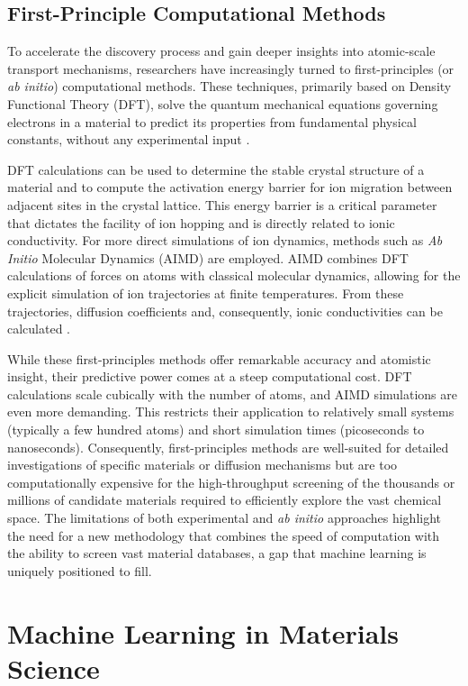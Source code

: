 \subsection{First-Principle Computational Methods}

To accelerate the discovery process and gain deeper insights into atomic-scale transport mechanisms, researchers have increasingly turned to first-principles (or \textit{ab initio}) computational methods. These techniques, primarily based on Density Functional Theory (DFT), solve the quantum mechanical equations governing electrons in a material to predict its properties from fundamental physical constants, without any experimental input \cite{Kohn1965}.

DFT calculations can be used to determine the stable crystal structure of a material and to compute the activation energy barrier for ion migration between adjacent sites in the crystal lattice. This energy barrier is a critical parameter that dictates the facility of ion hopping and is directly related to ionic conductivity. For more direct simulations of ion dynamics, methods such as \textit{Ab Initio} Molecular Dynamics (AIMD) are employed. AIMD combines DFT calculations of forces on atoms with classical molecular dynamics, allowing for the explicit simulation of ion trajectories at finite temperatures. From these trajectories, diffusion coefficients and, consequently, ionic conductivities can be calculated \cite{He2017}.

While these first-principles methods offer remarkable accuracy and atomistic insight, their predictive power comes at a steep computational cost. DFT calculations scale cubically with the number of atoms, and AIMD simulations are even more demanding. This restricts their application to relatively small systems (typically a few hundred atoms) and short simulation times (picoseconds to nanoseconds). Consequently, first-principles methods are well-suited for detailed investigations of specific materials or diffusion mechanisms but are too computationally expensive for the high-throughput screening of the thousands or millions of candidate materials required to efficiently explore the vast chemical space. The limitations of both experimental and \textit{ab initio} approaches highlight the need for a new methodology that combines the speed of computation with the ability to screen vast material databases, a gap that machine learning is uniquely positioned to fill.

\section{Machine Learning in Materials Science}

